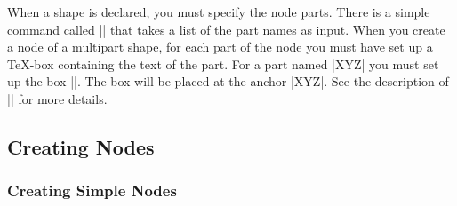 When a shape is declared, you must specify the node parts. There is a simple
command called |\nodeparts| that takes a list of the part names as input. When
you create a node of a multipart shape, for each part of the node you must have
set up a \TeX-box containing the text of the part. For a part named |XYZ| you
must set up the box |\pgfnodepartXYZbox|. The box will be placed at the anchor
|XYZ|. See the description of |\pgfmultipartnode| for more details.


\subsection{Creating Nodes}

\subsubsection{Creating Simple Nodes}

